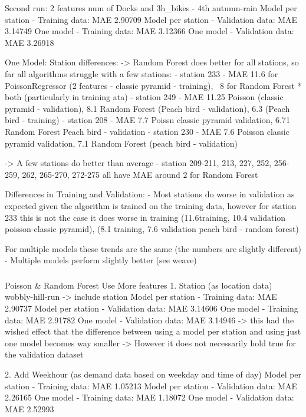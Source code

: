 \documentclass[a4paper]{article}
\begin{document}
    Second run: 2 features num of Docks and 3h\_bikes - 4th autumn-rain
    Model per station - Training data: MAE 2.90709
    Model per station - Validation data: MAE 3.14749
    One model - Training data: MAE 3.12366
    One model - Validation data: MAE 3.26918

    One Model:
    Station differences:
    -> Random Forest does better for all stations, so far all algorithms struggle with a few stations:
    - station 233 - MAE 11.6 for PoissonRegressor (2 features - classic pyramid - training), ~8 for Random Forest * both (particularly in training ata)
    - station 249 - MAE 11.25 Poisson (classic pyramid - validation), 8.1 Random Forest (Peach bird - validation),
    6.3 (Peach bird - training)
    - station 208 - MAE 7.7 Poissn classic pyramid validation, 6.71 Random Forest Peach bird - validation
    - station 230 - MAE 7.6 Poisson classic pyramid validation, 7.1 Random Forest (peach bird - validation)

    -> A few stations do better than average
    - station 209-211, 213, 227, 252, 256-259, 262, 265-270, 272-275 all have MAE around 2 for Random Forest

    Differences in Training and Validation:
    - Most stations do worse in validation as expected given the algorithm is trained on the training data, however for station
    233 this is not the case it does worse in training (11.6training, 10.4 validation poisson-classic pyramid),
    (8.1 training, 7.6 validation peach bird -  random forest)

    For multiple models these trends are the same (the numbers are slightly different)
    - Multiple models perform slightly better (see weave)

    \subsubsection*{}
    Poisson & Random Forest Use More features
    1. Station (as location data)
    wobbly-hill-run -> include station
    Model per station - Training data: MAE 2.90737
    Model per station - Validation data: MAE 3.14606
    One model - Training data: MAE 2.91782
    One model - Validation data: MAE 3.14946
    -> this had the wished effect that the difference between using a model per station and using just one model
    becomes way smaller
    -> However it does not necessarily hold true for the validation dataset

    2. Add Weekhour (as demand data based on weekday and time of day)
    Model per station - Training data: MAE 1.05213
    Model per station - Validation data: MAE 2.26165
    One model - Training data: MAE 1.18072
    One model - Validation data: MAE 2.52993
\end{document}
